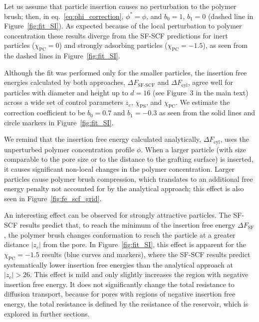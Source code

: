 \documentclass[10pt, a4paper]{article}
\begin{document}
\begin{multicols}{2}
Let us assume that particle insertion causes no perturbation to the polymer brush; then, in eq.~\ref{eq:phi_correction}, $\phi^{\ast} = \phi$, and $b_0 = 1$, $b_1 = 0$ (dashed line in Figure~\ref{fig:fit_SI}).
As expected because of the local perturbation to polymer concentration these results diverge from the SF-SCF predictions for inert particles ($\chi_{\text{PC}} = 0$) and strongly adsorbing particles ($\chi_{\text{PC}} = -1.5$), as seen from the dashed lines in Figure~\ref{fig:fit_SI}.


Although the fit was performed only for the smaller particles, the insertion free energies calculated by both approaches, $\Delta F_{\text{SF-SCF}}$ and $\Delta F_{\text{cyl}}$, agree well for particles with diameter and height up to $d = 16$ (see Figure~3 in the main text) across a wide set of control parameters $z_c$, $\chi_{\text{PS}}$, and $\chi_{\text{PC}}$.
We estimate the correction coefficient to be $b_0=0.7$ and $b_1 = -0.3$ as seen from the solid lines and circle markers in Figure~\ref{fig:fit_SI}.

We remind that the insertion free energy calculated analytically, $\Delta F_{\text{cyl}}$, uses the unperturbed polymer concentration profile $\phi$.
When a larger particle (with size comparable to the pore size or to the distance to the grafting surface) is inserted, it causes significant non-local changes in the polymer concentration.
Larger particles cause polymer brush compression, which translates to an additional free energy penalty not accounted for by the analytical approach; this effect is also seen in Figure~\ref{fig:fe_scf_grid}.


An interesting effect can be observed for strongly attractive particles.
The SF-SCF results predict that, to reach the minimum of the insertion free energy $\Delta F_{\text{SF}}$, the polymer brush changes conformation to reach the particle at a greater distance $|z_c|$ from the pore.
In Figure~\ref{fig:fit_SI}, this effect is apparent for the $\chi_{\text{PC}} = -1.5$ results (blue curves and markers), where the SF-SCF results predict systematically lower insertion free energies than the analytical approach at $|z_c| > 26$.
This effect is mild and only slightly increases the region with negative insertion free energy.
It does not significantly change the total resistance to diffusion transport, because for pores with regions of negative insertion free energy, the total resistance is defined by the resistance of the reservoir, which is explored in further sections.


\end{multicols}
\end{document}
